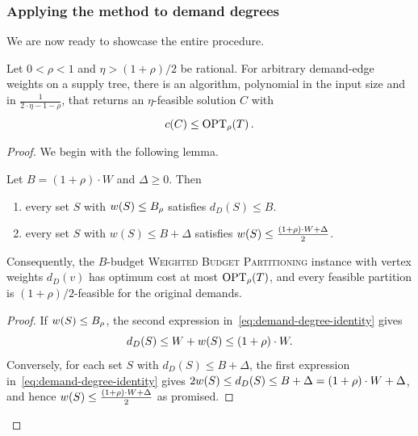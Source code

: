 \subsubsection{Applying the method to demand degrees}

We are now ready to showcase the entire procedure.

\begin{theorem}\label{thm:tree-weighted-budget-direct}
    Let $0<\rho<1$ and $\eta>(1+\rho)/2$ be rational. For arbitrary demand-edge weights on a supply tree, there is an algorithm, polynomial in the input size and in $
        \frac{1}{2\cdot\eta-1-\rho}$,
    that returns an $\eta$-feasible solution $C$ with
    \[
        c\mathopen{}\left( C \right)\leq\textup{OPT}_{\rho}\mathopen{}\left( T \right).
    \]
\end{theorem}
\begin{proof}
    We begin with the following lemma.
\begin{lemma}\label{lem:weighted-budget-demand-degree}
    Let $B=(1+\rho)\cdot W$ and $\Delta\geq 0$. Then
    \begin{enumerate}
        \item every set $S$ with $w\mathopen{}\left( S \right)\leq B_\rho$ satisfies $d_D(S)\leq B$.
        \item every set $S$ with $w(S)\leq B+\Delta$ satisfies $w\mathopen{}\left( S \right)\leq\frac{\mathopen{}\left( 1+\rho \right)\cdot W+\Delta}{2}$.
    \end{enumerate}
    Consequently, the $B$-budget \textsc{Weighted Budget Partitioning} instance with vertex weights $d_D(v)$ has optimum cost at most $\textup{OPT}_{\rho}\mathopen{}\left( T \right)$, and every feasible partition is $(1+\rho)/2$-feasible for the original demands.
\end{lemma}
\begin{proof}
    If $w\mathopen{}\left( S \right)\leq B_\rho$, the second expression in~\eqref{eq:demand-degree-identity} gives
    \[
        d_D(S)\leq W+w\mathopen{}\left( S \right)\leq(1+\rho)\cdot W.
    \]
    Conversely, for each set $S$ with $d_D(S)\leq B+\Delta$, the first expression in~\eqref{eq:demand-degree-identity} gives $2w\mathopen{}\left( S \right)\leq d_D(S)\leq B+\Delta=(1+\rho)\cdot W+\Delta$, and hence $w\mathopen{}\left( S \right)\leq\frac{\mathopen{}\left( 1+\rho \right)\cdot W+\Delta}{2}$ as promised.
\end{proof}


\end{proof}
